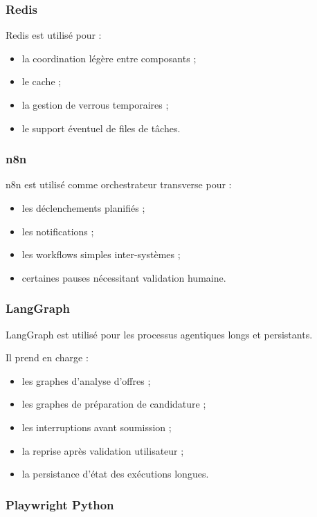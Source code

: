 \documentclass[11pt,a4paper]{article}
\begin{document}
\subsubsection{Redis}

Redis est utilisé pour :

\begin{itemize}
    \item la coordination légère entre composants ;
    \item le cache ;
    \item la gestion de verrous temporaires ;
    \item le support éventuel de files de tâches.
\end{itemize}

\subsubsection{n8n}

n8n est utilisé comme orchestrateur transverse pour :

\begin{itemize}
    \item les déclenchements planifiés ;
    \item les notifications ;
    \item les workflows simples inter-systèmes ;
    \item certaines pauses nécessitant validation humaine.
\end{itemize}

\subsubsection{LangGraph}

LangGraph est utilisé pour les processus agentiques longs et persistants.

Il prend en charge :

\begin{itemize}
    \item les graphes d’analyse d’offres ;
    \item les graphes de préparation de candidature ;
    \item les interruptions avant soumission ;
    \item la reprise après validation utilisateur ;
    \item la persistance d’état des exécutions longues.
\end{itemize}

\subsubsection{Playwright Python}
\end{document}
